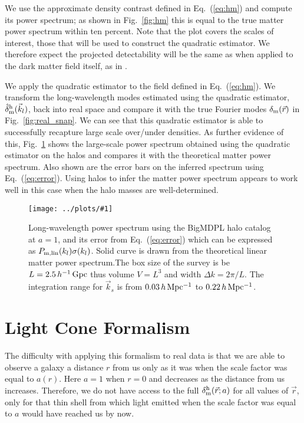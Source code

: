 \documentclass[prd,amsmath,amssymb,floatfix,superscriptaddress,nofootinbib,twocolumn]{revtex4-1}
\newcommand{\vrr}{\vec{r}}
\newcommand{\vk}{\vec{k}}
\newcommand{\ec}[1]{Eq.~(\ref{eq:#1})}
\newcommand{\rf}[1]{\ref{fig:#1}}
\newcommand{\sfig}[2]{
\texttt{[image: ../plots/\#1]}
        }
\newcommand{\Sfig}[2]{
   \begin{figure}[thbp]
   \begin{center}
    \sfig{../plots/#1.pdf}{\columnwidth}
    \caption{{\small #2}}
    \label{fig:#1}
     \end{center}
   \end{figure}
}
\newcommand\dmh{\delta_{\rm m}^{\rm h}}
\newcommand\hdmh{\hat{\delta}_{\rm m}^{\rm h}}
\begin{document}
We use the approximate density contrast defined in \ec{hm} and compute its power spectrum; as shown in Fig.~\rf{hm} this is equal to the true matter power spectrum within ten percent. Note that the plot covers the scales of interest, those that will be used to construct the quadratic estimator.
We therefore expect the projected detectability will be the same as when applied to the dark matter field itself, as in  \cite{Li:2020fir}. 

We apply the quadratic estimator to the field defined in \ec{hm}. We transform the long-wavelength modes estimated using the quadratic estimator, $\hdmh(\vk_l)$, back into real space and compare it with the true Fourier modes $\delta_{\rm m}(\vrr)$ in Fig.~\rf{real_snap}. We can see that this quadratic estimator is able to successfully recapture large scale over/under densities. 
As further evidence of this, 
Fig.~\rf{SN_BIGMDPL} shows the large-scale power spectrum obtained using the quadratic estimator on the halos and compares it with the theoretical matter power spectrum. Also shown are the error bars on the inferred spectrum using \ec{error}. Using halos to infer the matter power spectrum appears to work well in this case when the halo masses are well-determined.




\Sfig{SN_BIGMDPL}{Long-wavelength power spectrum using the BigMDPL halo catalog at $a=1$, and its error from \ec{error} which can be expressed as $P_{\rm m, lin}(k_l)\sigma(k_l)$. Solid curve is drawn from the theoretical linear matter power spectrum.The box size of the survey is be $L=2.5\, h^{-1}\rm\, Gpc$ thus volume $V=L^3$ and width $\Delta k = 2\pi/L$. The integration range for $\vk_s$ is from $0.03 \,h \,\rm Mpc^{-1}$ to $0.22\,h\,\rm Mpc^{-1}$.}

 

\section{Light Cone Formalism} \label{sec4}

The difficulty with applying this formalism to real data is that we are able to observe a galaxy a distance $r$ from us only as it was when the scale factor was equal to $a(r)$. Here $a=1$ when $r=0$ and decreases as the distance from us increases. Therefore, we do not have access to the full $\dmh(\vec r; a)$ for all values of $\vec r$, only for that thin shell from which light emitted when the scale factor was equal to $a$ would have reached us by now.
\end{document}
